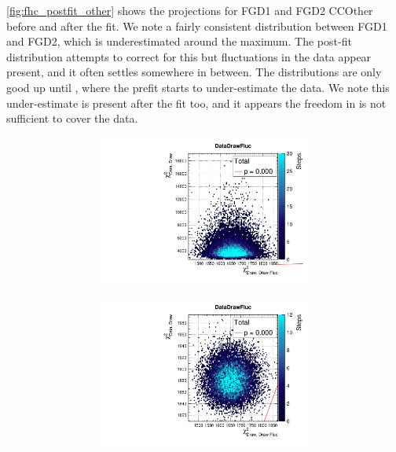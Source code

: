 \autoref{fig:fhc_postfit_other} shows the projections for FGD1 and FGD2 CCOther before and after the fit. We note a fairly consistent \pmu distribution between FGD1 and FGD2, which is underestimated around the maximum. The post-fit distribution attempts to correct for this but fluctuations in the data appear present, and it often settles somewhere in between. The \cosmu distributions are only good up until , where the prefit starts to under-estimate the data. We note this under-estimate is present after the fit too, and it appears the freedom in \cosmu is not sufficient to cover the data. 
\begin{figure}[h]
\begin{subfigure}[t]{\textwidth}
\begin{subfigure}[t]{0.24\textwidth}
	\includegraphics[width=\textwidth, trim={0mm 0mm 0mm 8mm}, clip,page=28]{figures/mach3/data/priorpred/2017b_NewDet_3Xsec_4Det_5Flux_NewXSecTune_Data_merge_PriorPred_procs}
\end{subfigure}
\begin{subfigure}[t]{0.24\textwidth}
	\includegraphics[width=\textwidth, trim={0mm 0mm 0mm 8mm}, clip,page=28]{figures/mach3/data/postpred/2017b_NewData_NewDet_UpdXsecStep_2Xsec_4Det_5Flux_0_PostPred_procs}

\end{subfigure}
\end{subfigure}
\end{figure}
